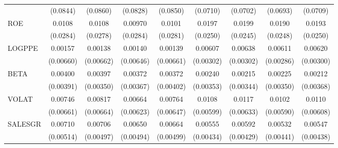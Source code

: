 \begin{table}[htbp]
\begin{tabular}{l*{8}{c}}
                    &    (0.0844)         &    (0.0860)         &    (0.0828)         &    (0.0850)         &    (0.0710)         &    (0.0702)         &    (0.0693)         &    (0.0709)         \\
ROE                 &      0.0108         &      0.0108         &     0.00970         &      0.0101         &      0.0197         &      0.0199         &      0.0190         &      0.0193         \\
                    &    (0.0284)         &    (0.0278)         &    (0.0284)         &    (0.0281)         &    (0.0250)         &    (0.0245)         &    (0.0248)         &    (0.0250)         \\
LOGPPE              &     0.00157         &     0.00138         &     0.00140         &     0.00139         &     0.00607\sym{*}  &     0.00638\sym{*}  &     0.00611\sym{*}  &     0.00620\sym{*}  \\
                    &   (0.00660)         &   (0.00662)         &   (0.00646)         &   (0.00661)         &   (0.00302)         &   (0.00302)         &   (0.00286)         &   (0.00300)         \\
BETA                &     0.00400         &     0.00397         &     0.00372         &     0.00372         &     0.00240         &     0.00215         &     0.00225         &     0.00212         \\
                    &   (0.00391)         &   (0.00350)         &   (0.00367)         &   (0.00402)         &   (0.00353)         &   (0.00344)         &   (0.00350)         &   (0.00368)         \\
VOLAT               &     0.00746         &     0.00817         &     0.00664         &     0.00764         &      0.0108\sym{*}  &      0.0117\sym{*}  &      0.0102         &      0.0110\sym{*}  \\
                    &   (0.00661)         &   (0.00664)         &   (0.00623)         &   (0.00647)         &   (0.00599)         &   (0.00633)         &   (0.00590)         &   (0.00608)         \\
SALESGR             &     0.00710         &     0.00706         &     0.00650         &     0.00664         &     0.00555         &     0.00592         &     0.00532         &     0.00547         \\
                    &   (0.00514)         &   (0.00497)         &   (0.00494)         &   (0.00499)         &   (0.00434)         &   (0.00429)         &   (0.00441)         &   (0.00438)         \\

\end{tabular}
\end{table}
